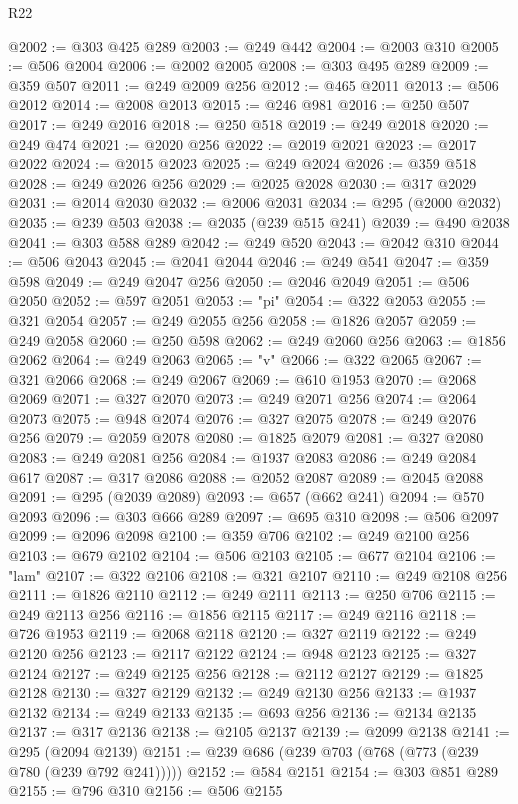 \begin{lexlean}{R22}
\begin{coremodule}
@2002 := @303 @425 @289
@2003 := @249 @442
@2004 := @2003 @310
@2005 := @506 @2004
@2006 := @2002 @2005
@2008 := @303 @495 @289
@2009 := @359 @507
@2011 := @249 @2009 @256
@2012 := @465 @2011
@2013 := @506 @2012
@2014 := @2008 @2013
@2015 := @246 @981
@2016 := @250 @507
@2017 := @249 @2016
@2018 := @250 @518
@2019 := @249 @2018
@2020 := @249 @474
@2021 := @2020 @256
@2022 := @2019 @2021
@2023 := @2017 @2022
@2024 := @2015 @2023
@2025 := @249 @2024
@2026 := @359 @518
@2028 := @249 @2026 @256
@2029 := @2025 @2028
@2030 := @317 @2029
@2031 := @2014 @2030
@2032 := @2006 @2031
@2034 := @295 (@2000 @2032)
@2035 := @239 @503
@2038 := @2035 (@239 @515 @241)
@2039 := @490 @2038
@2041 := @303 @588 @289
@2042 := @249 @520
@2043 := @2042 @310
@2044 := @506 @2043
@2045 := @2041 @2044
@2046 := @249 @541
@2047 := @359 @598
@2049 := @249 @2047 @256
@2050 := @2046 @2049
@2051 := @506 @2050
@2052 := @597 @2051
@2053 := "pi"
@2054 := @322 @2053
@2055 := @321 @2054
@2057 := @249 @2055 @256
@2058 := @1826 @2057
@2059 := @249 @2058
@2060 := @250 @598
@2062 := @249 @2060 @256
@2063 := @1856 @2062
@2064 := @249 @2063
@2065 := "v"
@2066 := @322 @2065
@2067 := @321 @2066
@2068 := @249 @2067
@2069 := @610 @1953
@2070 := @2068 @2069
@2071 := @327 @2070
@2073 := @249 @2071 @256
@2074 := @2064 @2073
@2075 := @948 @2074
@2076 := @327 @2075
@2078 := @249 @2076 @256
@2079 := @2059 @2078
@2080 := @1825 @2079
@2081 := @327 @2080
@2083 := @249 @2081 @256
@2084 := @1937 @2083
@2086 := @249 @2084 @617
@2087 := @317 @2086
@2088 := @2052 @2087
@2089 := @2045 @2088
@2091 := @295 (@2039 @2089)
@2093 := @657 (@662 @241)
@2094 := @570 @2093
@2096 := @303 @666 @289
@2097 := @695 @310
@2098 := @506 @2097
@2099 := @2096 @2098
@2100 := @359 @706
@2102 := @249 @2100 @256
@2103 := @679 @2102
@2104 := @506 @2103
@2105 := @677 @2104
@2106 := "lam"
@2107 := @322 @2106
@2108 := @321 @2107
@2110 := @249 @2108 @256
@2111 := @1826 @2110
@2112 := @249 @2111
@2113 := @250 @706
@2115 := @249 @2113 @256
@2116 := @1856 @2115
@2117 := @249 @2116
@2118 := @726 @1953
@2119 := @2068 @2118
@2120 := @327 @2119
@2122 := @249 @2120 @256
@2123 := @2117 @2122
@2124 := @948 @2123
@2125 := @327 @2124
@2127 := @249 @2125 @256
@2128 := @2112 @2127
@2129 := @1825 @2128
@2130 := @327 @2129
@2132 := @249 @2130 @256
@2133 := @1937 @2132
@2134 := @249 @2133
@2135 := @693 @256
@2136 := @2134 @2135
@2137 := @317 @2136
@2138 := @2105 @2137
@2139 := @2099 @2138
@2141 := @295 (@2094 @2139)
@2151 := @239 @686 (@239 @703 (@768 (@773 (@239 @780 (@239 @792 @241)))))
@2152 := @584 @2151
@2154 := @303 @851 @289
@2155 := @796 @310
@2156 := @506 @2155

\end{coremodule}
\end{lexlean}
